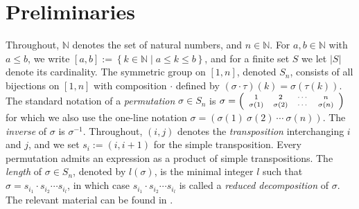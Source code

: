 \documentclass[a4 paper,12pt]{article}
\newcommand{\NN}{\mathbb{N}}
\begin{document}
\section{Preliminaries}
\begin{small}
Throughout,  $\NN$ denotes the set of natural numbers, and $n\in \NN$.  For  $a,b\in \NN$ with $a\leq b$, we write $\left[a,b\right]:=\left\{k\in \NN \mid a\leq k\leq b\right\}$, 
 and for a finite set $S$ we let $|S|$ denote its cardinality. The symmetric group on $[1,n]$, denoted $S_n$, consists of all bijections on $[1,n]$ with composition $\cdot $ defined by $\left(\sigma\cdot  \tau\right)(k)=\sigma (\tau(k))$. The standard notation of a \textit{permutation} $\sigma\in S_n$  is $\sigma = \begin{scriptsize}\left(
\begin{array}{ccccc}
               1 &       2  & \cdots & n\\
        \sigma(1)&\sigma(2)& \cdots &\sigma(n)
\end{array}
\right)\end{scriptsize}$ for which we also use the
one-line notation $\sigma =\left(
        \sigma(1) \ \sigma(2) \ \cdots  \ \sigma(n)
\right)$. The \textit{inverse} of $\sigma$ is $\sigma^{-1}$. Throughout, $(i,j)$ denotes the \textit{transposition} interchanging $i$ and $j$, and we set $s_i := (i, i+1)$ for the simple transposition.
Every permutation admits an expression as a product of simple transpositions.  The \textit{length} of $\sigma \in S_{n}$, denoted by $l(\sigma)$, is the minimal integer $l$ such that 
$\sigma = s_{i_1}\cdot  s_{i_2} \cdots  s_{i_l}  $,  in which case  $ s_{i_1}\cdot  s_{i_2} \cdots  s_{i_l} $ is called a \emph{reduced decomposition} of 
$\sigma$. 
The relevant material can be found in \cite[Chapter 1]{Bjor}.  
  \end{small}
\end{document}
